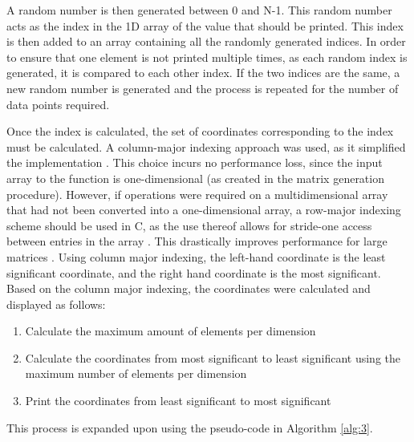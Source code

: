 \documentclass[10pt,twocolumn]{witseiepaper}
\begin{document}
A random number is then generated between 0 and N-1. This random number acts as the index in the 1D array of the value that should be printed. This index is then added to an array containing all the randomly generated indices. In order to ensure that one element is not printed multiple times, as each random index is generated, it is compared to each other index. If the two indices are the same, a new random number is generated and the process is repeated for the number of data points required.

Once the index is calculated, the set of coordinates corresponding to the index must be calculated. A column-major indexing approach was used, as it simplified the implementation \cite{HPC}. This choice incurs no performance loss, since the input array to the function is one-dimensional (as created in the matrix generation procedure). However, if operations were required on a multidimensional array that had not been converted into a one-dimensional array, a row-major indexing scheme should be used in C, as the use thereof allows for stride-one access between entries in the array \cite{HPC}. This drastically improves performance for large matrices \cite{HPC}. Using column major indexing, the left-hand coordinate is the least significant coordinate, and the right hand coordinate is the most significant. Based on the column major indexing, the coordinates were calculated and displayed as follows:

\begin{enumerate}
	\item Calculate the maximum amount of elements per dimension
	\item Calculate the coordinates from most significant to least significant using the maximum number of elements per dimension
	\item Print the coordinates from least significant to most significant
\end{enumerate}

This process is expanded upon using the pseudo-code in Algorithm \ref{alg:3}.




\newpage
\onecolumn
\end{document}
